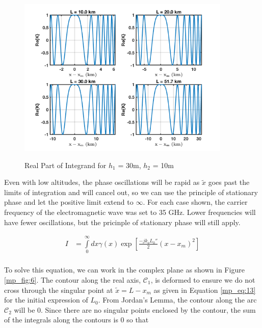 \begin{figure}[H]
  \begin{center}
\includegraphics[width=4in]{../media/analysis/phaseVariation_30_50}
  \end{center}
  \renewcommand{\baselinestretch}{1} \small\normalsize
  \begin{quote}
  \caption[Real Part of Integrand for $h_1$ = 30m, $h_2$ = 50m]{ Real Part of Integrand for $h_1$ = 30m, $h_2$ = 10m\label{mp_fig:5}}
  \end{quote}
\end{figure}
\renewcommand{\baselinestretch}{2} \small\normalsize

Even with low altitudes, the phase oscillations will be rapid as $\tilde{x}$ goes past the limits of integration and will cancel out, so we can use the principle of stationary phase and let the positive limit extend to $\infty$. For each case shown, the carrier frequency of the electromagnetic wave was set to 35 GHz. Lower frequencies will have fewer oscillations, but the pricinple of stationary phase will still apply.

\begin{equation}
\begin{aligned}
I&=\int\limits_{0}^{\infty}dx\gamma(x)\exp\left[\frac{-jk_oL_0''}{2}(x-x_m)^2\right]\\
\end{aligned}
\label{mp_eq:23}
\end{equation}

To solve this equation, we can work in the complex plane as shown in Figure \ref{mp_fig:6}. The contour along the real axis, $\mathcal{C}_1$, is deformed to ensure we do not cross through the singular point at $\tilde{x} = L-x_m$ as given in Equation \ref{mp_eq:13} for the initial expression of $L_0$. From Jordan's Lemma, the contour along the arc $\mathcal{C}_2$ will be $0$. Since there are no singular points enclosed by the contour, the sum of the integrals along the contours is $0$ so that

